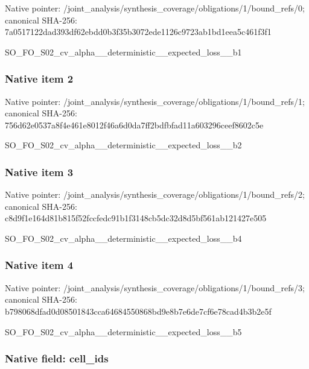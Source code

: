 \documentclass[10pt,a4paper]{article}
\begin{document}
Native pointer: /joint\_analysis/synthesi\allowbreak{}s\_coverage/obligations/1\allowbreak{}/bound\_refs/0; canonical SHA-256: 7a0517122dad393df62ebdd0\allowbreak{}b3f35b3072ede1126c9723ab\allowbreak{}1bd1eea5c461f3f1


SO\_FO\_S02\_cv\_alpha\_\_dete\allowbreak{}rministic\_\_expected\_loss\allowbreak{}\_\_b1


\subsubsection{Native item 2}


Native pointer: /joint\_analysis/synthesi\allowbreak{}s\_coverage/obligations/1\allowbreak{}/bound\_refs/1; canonical SHA-256: 756d62e0537a8f4e461e8012\allowbreak{}f46a6d0da7ff2bdfbfad11a6\allowbreak{}03296ceef8602c5e


SO\_FO\_S02\_cv\_alpha\_\_dete\allowbreak{}rministic\_\_expected\_loss\allowbreak{}\_\_b2


\subsubsection{Native item 3}


Native pointer: /joint\_analysis/synthesi\allowbreak{}s\_coverage/obligations/1\allowbreak{}/bound\_refs/2; canonical SHA-256: c8d9f1e164d81b815f52fccf\allowbreak{}edc91b1f3148cb5dc32d8d5b\allowbreak{}f561ab121427e505


SO\_FO\_S02\_cv\_alpha\_\_dete\allowbreak{}rministic\_\_expected\_loss\allowbreak{}\_\_b4


\subsubsection{Native item 4}


Native pointer: /joint\_analysis/synthesi\allowbreak{}s\_coverage/obligations/1\allowbreak{}/bound\_refs/3; canonical SHA-256: b798068dfad0d08501843cca\allowbreak{}64684550868bd9e8b7e6de7c\allowbreak{}f6e78cad4b3b2e5f


SO\_FO\_S02\_cv\_alpha\_\_dete\allowbreak{}rministic\_\_expected\_loss\allowbreak{}\_\_b5


\subsubsection{Native field: cell\_ids}
\end{document}
